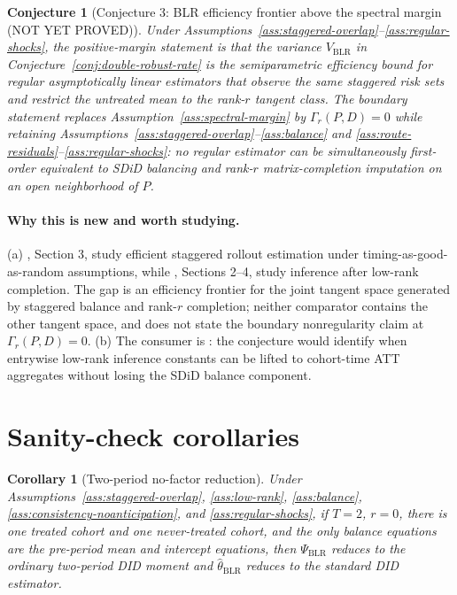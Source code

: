 \documentclass[11pt]{article}
\theoremstyle{definition}
\theoremstyle{plain}
\newtheorem{conjecture}{Conjecture}
\newtheorem{corollary}{Corollary}
\theoremstyle{remark}
\begin{document}
\begin{conjecture}[Conjecture 3: BLR efficiency frontier above the spectral margin (NOT YET PROVED)]\label{conj:efficiency-frontier}
Under Assumptions~\ref{ass:staggered-overlap}--\ref{ass:regular-shocks}, the
positive-margin statement is that the variance
$V_{\mathrm{BLR}}$ in Conjecture~\ref{conj:double-robust-rate} is the
semiparametric efficiency bound for regular asymptotically linear estimators
that observe the same staggered risk sets and restrict the untreated mean to
the rank-$r$ tangent class. The boundary statement replaces
Assumption~\ref{ass:spectral-margin} by $\Gamma_r(P,D)=0$ while retaining
Assumptions~\ref{ass:staggered-overlap}--\ref{ass:balance} and
\ref{ass:route-residuals}--\ref{ass:regular-shocks}: no regular estimator can
be simultaneously first-order equivalent to SDiD balancing and rank-$r$
matrix-completion imputation on an open neighborhood of $P$.
\end{conjecture}
\paragraph{Why this is new and worth studying.}
(a) \citet{RothSantAnna2021}, Section 3, study efficient staggered rollout
estimation under timing-as-good-as-random assumptions, while
\citet{ChoiKwonLiao2024}, Sections 2--4, study inference after low-rank
completion. The gap is an efficiency frontier for the joint tangent space
generated by staggered balance and rank-$r$ completion; neither comparator
contains the other tangent space, and \citet{AtheyImbensQuViviano2025} does
not state the boundary nonregularity claim at $\Gamma_r(P,D)=0$. (b) The
consumer is
\citet{YanWainwright2024}: the conjecture would identify when entrywise
low-rank inference constants can be lifted to cohort-time ATT aggregates
without losing the SDiD balance component.

\section{Sanity-check corollaries}
\begin{corollary}[Two-period no-factor reduction]\label{cor:two-period}
Under Assumptions~\ref{ass:staggered-overlap},
\ref{ass:low-rank}, \ref{ass:balance}, \ref{ass:consistency-noanticipation},
and \ref{ass:regular-shocks}, if
$T=2$, $r=0$, there is one treated cohort and one never-treated cohort, and
the only balance equations are the pre-period mean and intercept equations,
then $\Psi_{\mathrm{BLR}}$ reduces to the ordinary two-period DID moment and
$\widehat\theta_{\mathrm{BLR}}$ reduces to the standard DID estimator.
\end{corollary}
\end{document}
